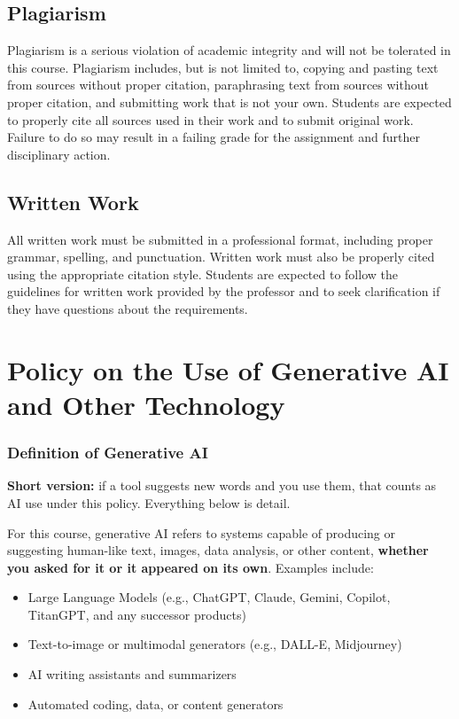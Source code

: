 \documentclass[11pt]{article}     %
\begin{document}
\subsection*{Plagiarism}
Plagiarism is a serious violation of academic integrity and will not be tolerated in this course. Plagiarism includes, but is not limited to, copying and pasting text from sources without proper citation, paraphrasing text from sources without proper citation, and submitting work that is not your own. Students are expected to properly cite all sources used in their work and to submit original work. Failure to do so may result in a failing grade for the assignment and further disciplinary action.

\subsection*{Written Work}
All written work must be submitted in a professional format, including proper grammar, spelling, and punctuation. Written work must also be properly cited using the appropriate citation style. Students are expected to follow the guidelines for written work provided by the professor and to seek clarification if they have questions about the requirements.

\section*{Policy on the Use of Generative AI and Other Technology}

\subsubsection*{Definition of Generative AI}

\noindent \textbf{Short version:} if a tool suggests new words and you use them, that counts as AI use under this policy. Everything below is detail.

\vspace{0.5em}
\noindent For this course, generative AI refers to systems capable of producing or suggesting human-like text, images, data analysis, or other content, \textbf{whether you asked for it or it appeared on its own}. Examples include:

\begin{itemize}
    \item Large Language Models (e.g., ChatGPT, Claude, Gemini, Copilot, TitanGPT, and any successor products)
    \item Text-to-image or multimodal generators (e.g., DALL-E, Midjourney)
    \item AI writing assistants and summarizers
    \item Automated coding, data, or content generators
\end{itemize}
\end{document}
